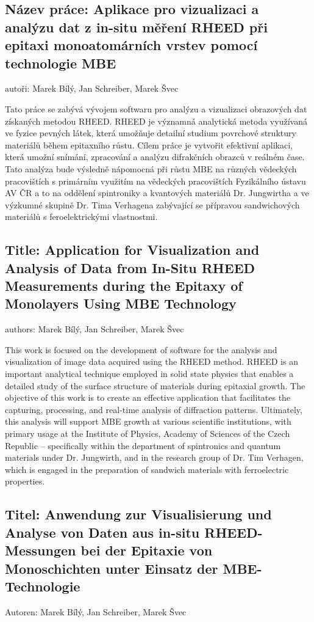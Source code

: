 \documentclass[a4paper,11pt]{article}
\begin{document}
\subsection*{Název práce: Aplikace pro vizualizaci a analýzu dat z in-situ měření RHEED při epitaxi monoatomárních vrstev pomocí technologie MBE}
autoři: Marek Bílý, Jan Schreiber, Marek Švec
\vspace{0.5cm}

Tato práce se zabývá vývojem softwaru pro analýzu a vizualizaci obrazových dat získaných metodou RHEED. RHEED je významná analytická metoda využívaná ve fyzice pevných látek, která umožňuje detailní studium povrchové struktury materiálů během epitaxního růstu. Cílem práce je vytvořit efektivní aplikaci, která umožní snímání, zpracování a analýzu difrakčních obrazců v reálném čase. Tato analýza bude výsledně nápomocná při růstu MBE na různých vědeckých pracovištích s primárním využitím na vědeckých pracovištích Fyzikálního ústavu AV ČR a to na oddělení spintroniky a kvantových materiálů Dr. Jungwirtha a ve výzkumné skupině Dr. Tima Verhagena zabývající se přípravou sandwichových materiálů s feroelektrickými vlastnostmi.

\subsection*{Title: Application for Visualization and Analysis of Data from In-Situ RHEED Measurements during the Epitaxy of Monolayers Using MBE Technology}
authors: Marek Bílý, Jan Schreiber, Marek Švec
\vspace{0.5cm}

This work is focused on the development of software for the analysis and visualization of image data acquired using the RHEED method. RHEED is an important analytical technique employed in solid state physics that enables a detailed study of the surface structure of materials during epitaxial growth. The objective of this work is to create an effective application that facilitates the capturing, processing, and real-time analysis of diffraction patterns. Ultimately, this analysis will support MBE growth at various scientific institutions, with primary usage at the Institute of Physics, Academy of Sciences of the Czech Republic – specifically within the department of spintronics and quantum materials under Dr. Jungwirth, and in the research group of Dr. Tim Verhagen, which is engaged in the preparation of sandwich materials with ferroelectric properties.

\subsection*{Titel: Anwendung zur Visualisierung und Analyse von Daten aus in-situ RHEED-Messungen bei der Epitaxie von Monoschichten unter Einsatz der MBE-Technologie}
Autoren: Marek Bílý, Jan Schreiber, Marek Švec
\vspace{0.5cm}
\end{document}
